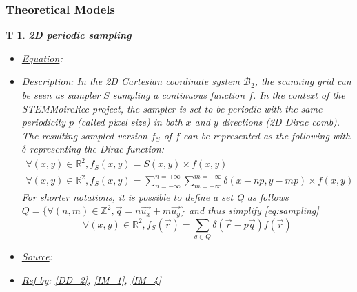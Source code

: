 \documentclass[12pt]{article}
\newcommand{\progname}{STEMMoireRec}
\newtheorem{T}{T}
\begin{document}
\subsubsection{Theoretical Models}\label{sec_theoretical}

\begin{T}
\label{T_1}
\noindent\colorbox{shadecolorT}{\normalfont \textbf{2D periodic sampling}}
\normalfont
\begin{itemize}
\item \underline{Equation}: 
\item \underline{Description}: In the 2D Cartesian coordinate system 
$\mathcal{B}_2$, the scanning grid can be seen as sampler $S$ sampling a 
continuous function $f$. In the context of the \progname{} project, the sampler 
is set to be periodic with the same periodicity $p$ (called pixel size) in both 
$x$ and $y$ directions (2D Dirac comb). The resulting sampled version $f_S$ of 
$f$ can be represented as the following with $\delta$ representing the Dirac 
function:
\begin{equation}
\begin{gathered}
\forall (x,y) \in \mathbb{R}^{2}, f_S(x,y)=S(x,y)\times f(x,y) \\
\forall (x,y) \in \mathbb{R}^{2}, 
f_S(x,y)=\sum_{n=-\infty}^{n=+\infty}\sum_{m=-\infty}^{m=+\infty}\delta(x-np,y-mp)\times 
f(x,y)
\end{gathered}
\label{eq:sampling}
\end{equation}
For shorter notations, it is possible to define a set Q as follows $Q=\{\forall 
(n,m) \in \mathbb{Z}^{2}, \vec{q}=n\vec{u_x}+m\vec{u_y}\}$ and thus simplify 
\cref{eq:sampling}
\begin{equation}
\forall (x,y) \in \mathbb{R}^{2}, f_S(\vec{r})=\sum_{q\in 
Q}\delta(\vec{r}-p\vec{q}) f(\vec{r})
\label{eq:sampling_simplified}
\end{equation}
\item \underline{Source}: \cite{Gonzalez_1992}
\item \underline{Ref by}: \cref{DD_2}, \cref{IM_1}, \cref{IM_4}
\end{itemize}
\end{T}
\end{document}
